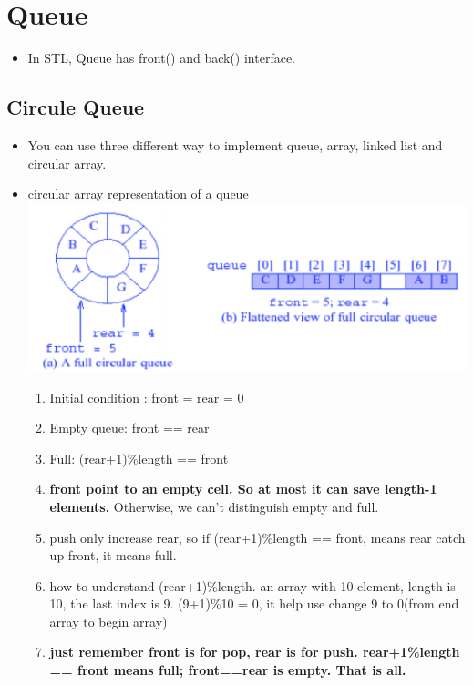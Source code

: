 \documentclass[a4paper,11pt,twoside]{book}
\begin{document}
\section{Queue}
\begin{itemize}
\item In STL, Queue has front() and back() interface. 

\end{itemize}


\subsection{Circule Queue}
\begin{itemize}
	
\item You can use three different way to implement queue, array, linked list and circular array.
	
\item circular array representation of a queue
\includegraphics[scale=0.35]{pics/cd.png} \newline
\begin{enumerate}
\item Initial condition : front = rear = 0
\item Empty queue:     front == rear
\item Full: (rear+1)\%length == front
\item \textbf{front point to an empty cell. So at most it can save length-1 elements. } Otherwise, we can't distinguish empty and full.

\item push only increase rear, so if (rear+1)\%length == front, means rear catch up front, it means full. 

\item how to understand (rear+1)\%length. an array with 10 element, length is 10, the last index is 9.  (9+1)\%10 = 0, it help use change 9 to 0(from end array to begin array)

\item \textbf{just remember front is for pop, rear is for push. rear+1\%length == front means full;  front==rear is empty. That is all. }


\end{enumerate}
\end{itemize}
\end{document}
